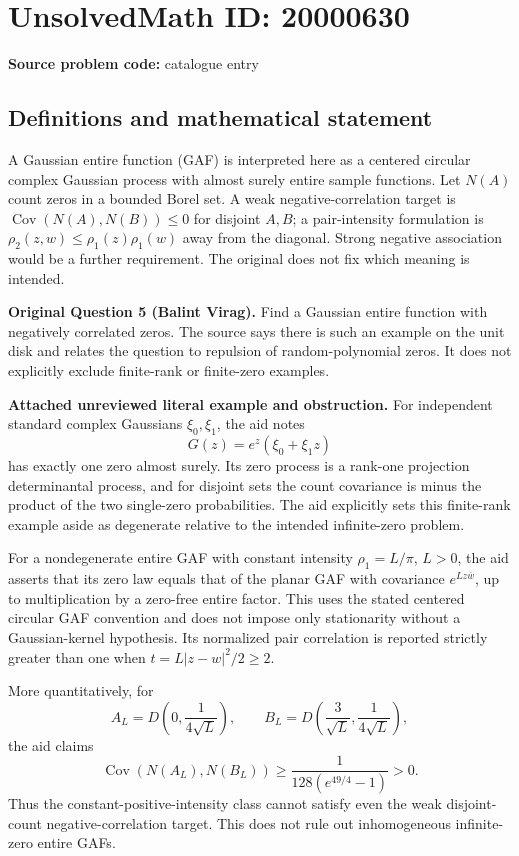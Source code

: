 \documentclass[11pt]{article}
\begin{document}
\section*{UnsolvedMath ID: 20000630}
\textbf{Source problem code:} catalogue entry
\subsection{Definitions and mathematical statement}
A Gaussian entire function (GAF) is interpreted here as a centered circular complex Gaussian process with almost surely entire sample functions. Let $N(A)$ count zeros in a bounded Borel set. A weak negative-correlation target is $\operatorname{Cov}(N(A),N(B))\le0$ for disjoint $A,B$; a pair-intensity formulation is $\rho_2(z,w)\le\rho_1(z)\rho_1(w)$ away from the diagonal. Strong negative association would be a further requirement. The original does not fix which meaning is intended.

\textbf{Original Question 5 (Balint Virag).} Find a Gaussian entire function with negatively correlated zeros. The source says there is such an example on the unit disk and relates the question to repulsion of random-polynomial zeros. It does not explicitly exclude finite-rank or finite-zero examples.

\textbf{Attached unreviewed literal example and obstruction.} For independent standard complex Gaussians $\xi_0,\xi_1$, the aid notes
\[G(z)=e^z(\xi_0+\xi_1z)\]
has exactly one zero almost surely. Its zero process is a rank-one projection determinantal process, and for disjoint sets the count covariance is minus the product of the two single-zero probabilities. The aid explicitly sets this finite-rank example aside as degenerate relative to the intended infinite-zero problem.

For a nondegenerate entire GAF with constant intensity $\rho_1=L/\pi$, $L>0$, the aid asserts that its zero law equals that of the planar GAF with covariance $e^{Lz\overline w}$, up to multiplication by a zero-free entire factor. This uses the stated centered circular GAF convention and does not impose only stationarity without a Gaussian-kernel hypothesis. Its normalized pair correlation is reported strictly greater than one when $t=L|z-w|^2/2\ge2$.

More quantitatively, for
\[A_L=D\left(0,\frac1{4\sqrt L}\right),\qquad B_L=D\left(\frac3{\sqrt L},\frac1{4\sqrt L}\right),\]
the aid claims
\[\operatorname{Cov}(N(A_L),N(B_L))\ge\frac1{128(e^{49/4}-1)}>0.\]
Thus the constant-positive-intensity class cannot satisfy even the weak disjoint-count negative-correlation target. This does not rule out inhomogeneous infinite-zero entire GAFs.
\end{document}

